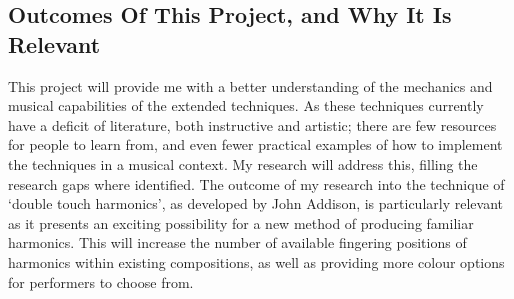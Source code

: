 \subsection{Outcomes Of This Project, and Why It Is Relevant}
This project will provide me with a better understanding of the mechanics and musical capabilities of the extended techniques. 
As these techniques currently have a deficit of literature, both instructive and artistic; there are few resources for people to learn from, and even fewer practical examples of how to implement the techniques in a musical context.
My research will address this, filling the research gaps where identified.
The outcome of my research into the technique of `double touch harmonics', as developed by John Addison, is particularly relevant as it presents an exciting possibility for a new method of producing familiar harmonics.
This will increase the number of available fingering positions of harmonics within existing compositions, as well as providing more colour options for performers to choose from.

